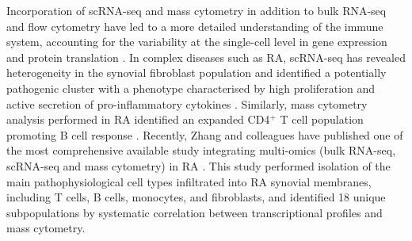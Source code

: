 Incorporation of scRNA-seq and mass cytometry in addition to bulk RNA-seq and flow cytometry have led to a more detailed understanding of the immune system, accounting for the variability at the single-cell level in gene expression and protein translation \parencite{Jaitin2014, Villani2017,Bengsch2018}. In complex diseases such as RA, scRNA-seq has revealed heterogeneity in the synovial fibroblast population and identified a potentially pathogenic cluster with a phenotype characterised by high proliferation and active secretion of pro-inflammatory cytokines \parencite{Fumitaka2018}. Similarly, mass cytometry analysis performed in RA identified an expanded CD4$^+$ T cell population promoting B cell response \parencite{Rao2017}. %
Recently, Zhang and colleagues have published one of the most comprehensive available study integrating multi-omics (bulk RNA-seq, scRNA-seq and mass cytometry) in RA \parencite{Zhang2018}. This study performed isolation of the main pathophysiological cell types infiltrated into RA synovial membranes, including T cells, B cells, monocytes, and fibroblasts, and identified 18 unique subpopulations by systematic correlation between transcriptional profiles and mass cytometry.




